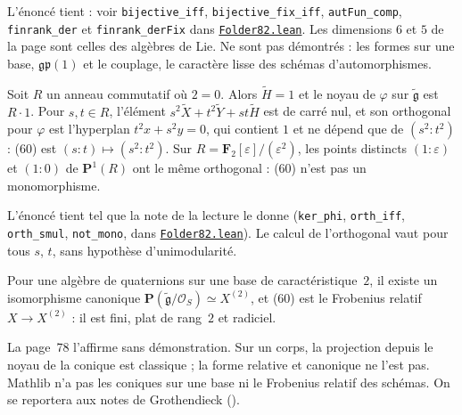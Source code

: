 \noindent L'énoncé tient : voir \texttt{bijective\_iff}, \texttt{bijective\_fix\_iff}, \texttt{autFun\_comp}, \texttt{finrank\_der} et \texttt{finrank\_derFix} dans \href{\leanblob/AlgebraicGeometry/Folder82.lean}{\texttt{Folder82.\allowbreak{}lean}}. Les dimensions $6$ et $5$ de la page sont celles des algèbres de Lie. Ne sont pas démontrés : les formes sur une base, $\mathfrak{gp}(1)$ et le couplage, le caractère lisse des schémas d'automorphismes.

\begin{encadre}
\begin{theoreme}\label{thm:82-frobenius}
Soit $R$ un anneau commutatif où $2 = 0$. Alors $\tilde H = 1$ et le noyau de $\varphi$ sur $\tilde{\mathfrak g}$ est $R \cdot 1$. Pour $s, t \in R$, l'élément $s^2\tilde X + t^2\tilde Y + st\tilde H$ est de carré nul, et son orthogonal pour $\varphi$ est l'hyperplan $t^2 x + s^2 y = 0$, qui contient $1$ et ne dépend que de $(s^2 : t^2)$ : (60) est $(s : t) \mapsto (s^2 : t^2)$. Sur $R = \mathbf F_2[\varepsilon]/(\varepsilon^2)$, les points distincts $(1 : \varepsilon)$ et $(1 : 0)$ de $\mathbf P^1(R)$ ont le même orthogonal : (60) n'est pas un monomorphisme.
\end{theoreme}
\end{encadre}

\noindent L'énoncé tient tel que la note de la lecture le donne (\texttt{ker\_phi}, \texttt{orth\_iff}, \texttt{orth\_smul}, \texttt{not\_mono}, dans \href{\leanblob/AlgebraicGeometry/Folder82.lean}{\texttt{Folder82.\allowbreak{}lean}}). Le calcul de l'orthogonal vaut pour tous $s$, $t$, sans hypothèse d'unimodularité.

\begin{encadre}
\begin{theoreme*}\nonverifie
Pour une algèbre de quaternions sur une base de caractéristique~$2$, il existe un isomorphisme canonique $\mathbf P(\tilde{\mathfrak g}/\mathcal O_S) \simeq X^{(2)}$, et (60) est le Frobenius relatif $X \to X^{(2)}$ : il est fini, plat de rang~$2$ et radiciel.
\end{theoreme*}
\end{encadre}
{\small La page~78 l'affirme sans démonstration. Sur un corps, la projection depuis le noyau de la conique est classique ; la forme relative et canonique ne l'est pas. Mathlib n'a pas les coniques sur une base ni le Frobenius relatif des schémas. On se reportera aux notes de Grothendieck ().\par}
